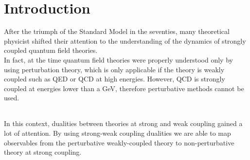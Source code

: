 

\chapter{Introduction}

After the triumph of the Standard Model in the seventies, many theoretical physicist shifted their attention to the understanding of the dynamics of strongly coupled quantum field theories. \\
In fact, at the time quantum field theories were properly understood only by using perturbation theory, which is only applicable if the theory is weakly coupled such as QED or QCD at high energies.
However, QCD is strongly coupled at energies lower than a GeV, therefore perturbative methods cannot be used.
\begin{comment}
Perturbative methods rely on the fact that the theory in question is weakly coupled, i.e. its coupling constant is much lower than one. This was not a problem for QED since its coupling constant $\alpha \sim 1/137$ is much lower than one at low energies and grows slowly while increasing the energy scale.
As a result, QED calculations have a high precision and non-perturbative methods were not needed.\\
In 1973 was discovered that quantum chromodynamics with three flavours is asymptotically free, i.e. its coupling constant becomes smaller at higher energies. 
As a result, collider physics can be understood in terms of Feynman diagrams but at low-energies the theory is strongly coupled and perturbation theory cannot be used to understand the dynamics of the theory.
Computer simulations on a lattice are the most reliable tool to investigate QCD at low-energies, but they cannot provide a complete understanding of the behavior of QCD.\\ 
\end{comment}\
\\
In this context, dualities between theories at strong and weak coupling gained a lot of attention. 
By using strong-weak coupling dualities we are able to map observables from the perturbative weakly-coupled theory to non-perturbative theory at strong coupling.
\\

